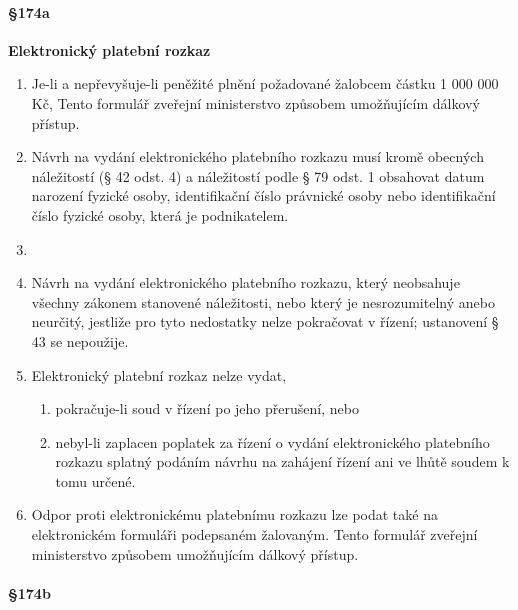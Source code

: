 \paragraph{\S 174a}\hfill\break

\textbf{\Large Elektronický platební rozkaz}

\begin{enumerate}[label={(\arabic*)}]
  \item Je-li  a nepřevyšuje-li peněžité plnění požadované žalobcem částku 1 000 000 Kč,  Tento formulář zveřejní ministerstvo způsobem umožňujícím dálkový přístup.
  \item Návrh na vydání elektronického platebního rozkazu musí kromě obecných náležitostí (§ 42 odst. 4) a náležitostí podle § 79 odst. 1 obsahovat datum narození fyzické osoby, identifikační číslo právnické osoby nebo identifikační číslo fyzické osoby, která je podnikatelem.
  \item {}
  \item Návrh na vydání elektronického platebního rozkazu, který neobsahuje všechny zákonem stanovené náležitosti, nebo který je nesrozumitelný anebo neurčitý,  jestliže pro tyto nedostatky nelze pokračovat v řízení; ustanovení § 43 se nepoužije.
  \item Elektronický platební rozkaz nelze vydat,
  \begin{enumerate}[label={\alph*)}]
    \item pokračuje-li soud v řízení po jeho přerušení, nebo
    \item nebyl-li zaplacen poplatek za řízení o vydání elektronického platebního rozkazu splatný podáním návrhu na zahájení řízení ani ve lhůtě soudem k tomu určené.
  \end{enumerate}
  \item Odpor proti elektronickému platebnímu rozkazu lze podat také na elektronickém formuláři podepsaném žalovaným. Tento formulář zveřejní ministerstvo způsobem umožňujícím dálkový přístup.
\end{enumerate}

\paragraph{\S 174b}

